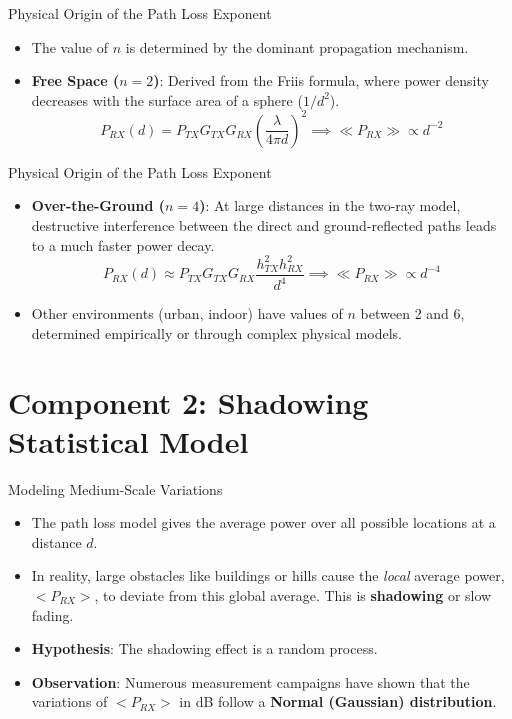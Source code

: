\documentclass{beamer}
\begin{document}
	\begin{frame}{Physical Origin of the Path Loss Exponent}
		\begin{itemize}
			\item The value of $n$ is determined by the dominant propagation mechanism.
			\item \textbf{Free Space ($n=2$)}: Derived from the Friis formula, where power density decreases with the surface area of a sphere ($1/d^2$).
			\[ P_{RX}(d) = P_{TX} G_{TX} G_{RX} \left(\frac{\lambda}{4\pi d}\right)^2 \implies \ll P_{RX} \gg \propto d^{-2} \]
		\end{itemize}
	\end{frame}
	
	\begin{frame}{Physical Origin of the Path Loss Exponent}
		\begin{itemize}
			\item \textbf{Over-the-Ground ($n=4$)}: At large distances in the two-ray model, destructive interference between the direct and ground-reflected paths leads to a much faster power decay.
			\[ P_{RX}(d) \approx P_{TX} G_{TX} G_{RX} \frac{h_{TX}^2 h_{RX}^2}{d^4} \implies \ll P_{RX} \gg \propto d^{-4} \]
			\item Other environments (urban, indoor) have values of $n$ between 2 and 6, determined empirically or through complex physical models.
		\end{itemize}
	\end{frame}
	
	\section{Component 2: Shadowing Statistical Model}
	
	\begin{frame}{Modeling Medium-Scale Variations}
		\begin{itemize}
			\item The path loss model gives the average power over all possible locations at a distance $d$.
			\item In reality, large obstacles like buildings or hills cause the \textit{local} average power, $<P_{RX}>$, to deviate from this global average. This is \textbf{shadowing} or slow fading.
			\item \textbf{Hypothesis}: The shadowing effect is a random process.
			\item \textbf{Observation}: Numerous measurement campaigns have shown that the variations of $<P_{RX}>$ in dB follow a \textbf{Normal (Gaussian) distribution}.
		\end{itemize}
	\end{frame}
	
\end{document}
